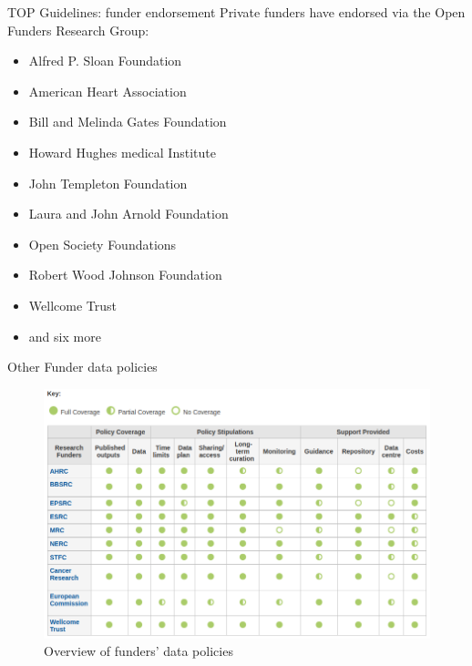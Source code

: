 \documentclass[aspectratio=169, 12pt]{beamer} %
\begin{document}
\begin{frame}{TOP Guidelines: funder endorsement}
  Private funders have endorsed via the Open Funders Research Group:
    \begin{itemize}[label=\textbullet]
        \item Alfred P. Sloan Foundation
        \item American Heart Association
        \item Bill and Melinda Gates Foundation
        \item Howard Hughes medical Institute
        \item John Templeton Foundation
        \item Laura and John Arnold Foundation
        \item Open Society Foundations
        \item Robert Wood Johnson Foundation
        \item Wellcome Trust
        \item and six more \cite{Ofrg2019-pq}
    \end{itemize}
\end{frame}

\begin{frame}{Other Funder data policies}
  \begin{figure}[H]
    \centering
        \includegraphics[height=.7\textheight]{figures/DCC-Funders.png}
        \caption{Overview of funders' data policies \cite{Dcc2019-jn}}
        \label{fig:Dcc2018}
  \end{figure}
\end{frame}
\end{document}
